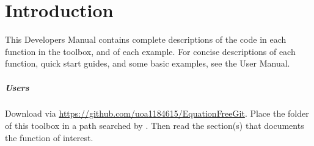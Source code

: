 \chapter{Introduction}

\begin{devMan}
This Developers Manual contains complete descriptions of the code in each function in the toolbox, and of each example.  For concise descriptions of each function, quick start guides, and some basic examples, see the User Manual.
\end{devMan}


\paragraph{Users}
Download via \url{https://github.com/uoa1184615/EquationFreeGit}.
Place the folder of this toolbox in a path searched by \script.
Then read the section(s) that documents the function of interest.


